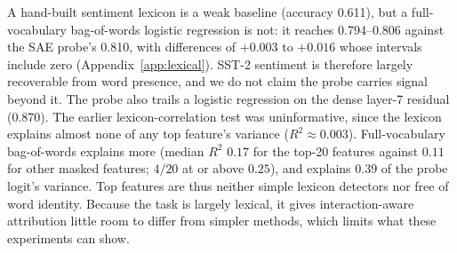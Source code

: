 A hand-built sentiment lexicon is a weak baseline (accuracy 0.611), but a full-vocabulary bag-of-words logistic regression is not: it reaches 0.794--0.806 against the SAE probe's 0.810, with differences of $+0.003$ to $+0.016$ whose intervals include zero (Appendix~\ref{app:lexical}). SST-2 sentiment is therefore largely recoverable from word presence, and we do not claim the probe carries signal beyond it. The probe also trails a logistic regression on the dense layer-7 residual (0.870). The earlier lexicon-correlation test was uninformative, since the lexicon explains almost none of any top feature's variance ($R^2\approx0.003$). Full-vocabulary bag-of-words explains more (median $R^2$ $0.17$ for the top-20 features against $0.11$ for other masked features; $4/20$ at or above $0.25$), and explains $0.39$ of the probe logit's variance. Top features are thus neither simple lexicon detectors nor free of word identity. Because the task is largely lexical, it gives interaction-aware attribution little room to differ from simpler methods, which limits what these experiments can show.